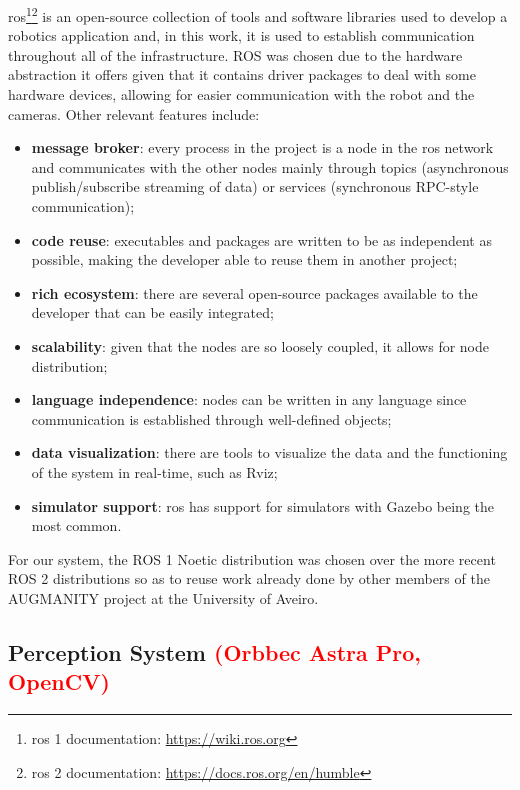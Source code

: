 \acs{ros}\cite{ROS2}\footnote{\acs{ros} 1 documentation: \url{https://wiki.ros.org}}\footnote{\acs{ros} 2 documentation: \url{https://docs.ros.org/en/humble}} is an open-source collection of tools and software libraries used to develop a robotics application and, in this work, it is used to establish communication throughout all of the infrastructure. ROS was chosen due to the hardware abstraction it offers given that it contains driver packages to deal with some hardware devices, allowing for easier communication with the robot and the cameras.
Other relevant features include:
\begin{itemize}
    \item \textbf{message broker}: every process in the project is a node in the \acs{ros} network and communicates with the other nodes mainly through topics (asynchronous publish/subscribe streaming of data) or services (synchronous RPC-style communication);
    \item \textbf{code reuse}: executables and packages are written to be as independent as possible, making the developer able to reuse them in another project;
    \item \textbf{rich ecosystem}: there are several open-source packages available to the developer that can be easily integrated;
    \item \textbf{scalability}: given that the nodes are so loosely coupled, it allows for node distribution;
    \item \textbf{language independence}: nodes can be written in any language since communication is established through well-defined objects;
    \item \textbf{data visualization}: there are tools to visualize the data and the functioning of the system in real-time, such as Rviz;
    \item \textbf{simulator support}: \acs{ros} has support for simulators with Gazebo being the most common.
\end{itemize}

For our system, the ROS 1 Noetic distribution was chosen over the more recent ROS 2 distributions so as to reuse work already done by other members of the AUGMANITY project at the University of Aveiro.

\subsection{Perception System \textcolor{red}{(Orbbec Astra Pro, OpenCV)}}
\label{subsection:perception_system}

